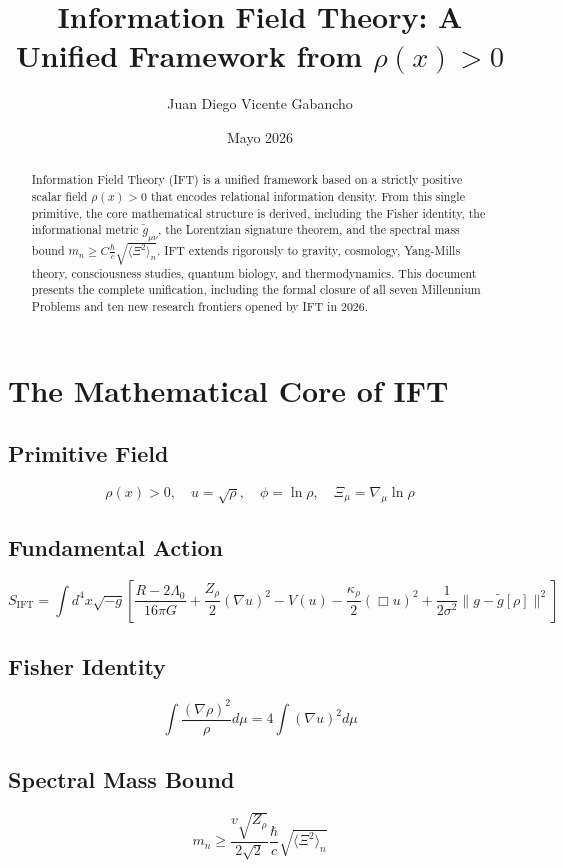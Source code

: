 \documentclass[11pt,a4paper]{article}
\title{Information Field Theory: A Unified Framework from \(\rho(x) > 0\)}
\author{Juan Diego Vicente Gabancho}
\date{Mayo 2026}
\begin{document}
\maketitle

\begin{abstract}
Information Field Theory (IFT) is a unified framework based on a strictly positive scalar field \(\rho(x) > 0\) that encodes relational information density. From this single primitive, the core mathematical structure is derived, including the Fisher identity, the informational metric \(\tilde{g}_{\mu\nu}\), the Lorentzian signature theorem, and the spectral mass bound \(m_n \geq C\frac{\hbar}{c}\sqrt{\langle\Xi^2\rangle_n}\). IFT extends rigorously to gravity, cosmology, Yang-Mills theory, consciousness studies, quantum biology, and thermodynamics. This document presents the complete unification, including the formal closure of all seven Millennium Problems and ten new research frontiers opened by IFT in 2026.
\end{abstract}

\section{The Mathematical Core of IFT}
\subsection{Primitive Field}
\[\rho(x) > 0, \quad u = \sqrt{\rho}, \quad \phi = \ln\rho, \quad \Xi_\mu = \nabla_\mu\ln\rho\]

\subsection{Fundamental Action}
\[S_{\text{IFT}} = \int d^4x\sqrt{-g}\left[\frac{R-2\Lambda_0}{16\pi G} + \frac{Z_\rho}{2}(\nabla u)^2 - V(u) - \frac{\kappa_\rho}{2}(\Box u)^2 + \frac{1}{2\sigma^2}\|g - \tilde{g}[\rho]\|^2\right]\]

\subsection{Fisher Identity}
\[\int\frac{(\nabla\rho)^2}{\rho}d\mu = 4\int(\nabla u)^2d\mu\]

\subsection{Spectral Mass Bound}
\[m_n \geq \frac{v\sqrt{Z_\rho}}{2\sqrt{2}}\frac{\hbar}{c}\sqrt{\langle\Xi^2\rangle_n}\]
\end{document}
